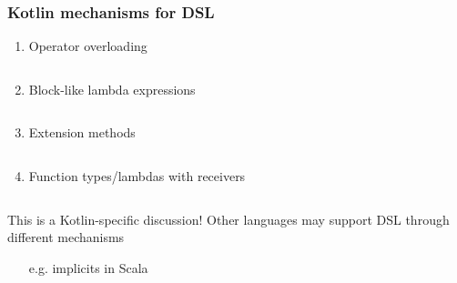 \documentclass[presentation]{beamer}
\begin{document}
\begin{frame}[allowframebreaks]
    \frametitle{Kotlin mechanisms for DSL}

    \begin{enumerate}
        \item Operator overloading
        \inputminted{kotlin}{code/Operators.kt}

        \framebreak

        \item Block-like lambda expressions
        \inputminted{kotlin}{code/Lambdas.kt}

        \item Extension methods
        \inputminted{kotlin}{code/Extensions.kt}

        \framebreak

        \item Function types/lambdas with receivers
        \inputminted{kotlin}{code/Receivers.kt}
    \end{enumerate}

    \framebreak

    \begin{alertblock}{This is a Kotlin-specific discussion!}
        Other languages may support DSL through different mechanisms
        \begin{itemize}
            \item[e.g.] implicits in Scala
        \end{itemize}
    \end{alertblock}

\end{frame}
\end{document}
